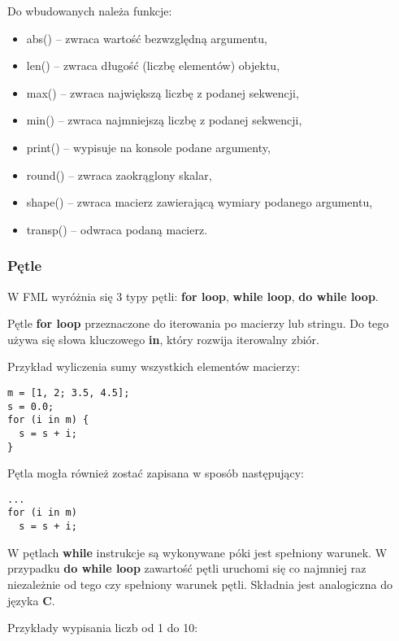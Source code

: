 \documentclass[12pt,a4paper]{article}
\begin{document}
\medskip
Do wbudowanych należa funkcje:

\begin{itemize}

  \item abs() -- zwraca wartość bezwzględną argumentu,
  \item len() -- zwraca długość (liczbę elementów) objektu,
  \item max() -- zwraca największą liczbę z podanej sekwencji,
  \item min() -- zwraca najmniejszą liczbę z podanej sekwencji,
  \item print() -- wypisuje na konsole podane argumenty,
  \item round() -- zwraca zaokrąglony skalar,
  \item shape() -- zwraca macierz zawierającą wymiary podanego argumentu,
  \item transp() -- odwraca podaną macierz.
  
\end{itemize}

\subsubsection{Pętle}

W FML wyróżnia się 3 typy pętli: \textbf{for loop}, \textbf{while loop}, \textbf{do while loop}.

\medskip

Pętle \textbf{for loop} przeznaczone do iterowania po macierzy lub stringu. Do tego używa się słowa kluczowego \textbf{in}, który rozwija iterowalny zbiór.

\medskip
Przykład wyliczenia sumy wszystkich elementów macierzy:

\begin{lstlisting}
m = [1, 2; 3.5, 4.5];
s = 0.0;
for (i in m) {
  s = s + i;
}
\end{lstlisting}

Pętla mogła również zostać zapisana w sposób następujący:
\begin{lstlisting}
...
for (i in m)
  s = s + i;
\end{lstlisting}

W pętlach \textbf{while} instrukcje są wykonywane póki jest spełniony warunek. W przypadku \textbf{do while loop} zawartość pętli uruchomi się co najmniej raz niezależnie od tego czy spełniony warunek pętli. Składnia jest analogiczna do języka \textbf{C}.

\medskip
Przykłady wypisania liczb od 1 do 10:
\end{document}
